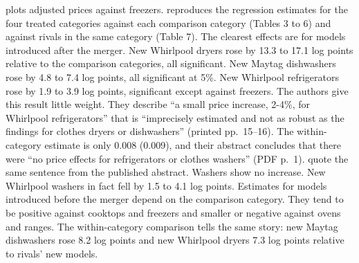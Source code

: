   plots adjusted prices against freezers.  reproduces
the regression estimates for the four treated categories against each comparison category (Tables 3 to 6) and
against rivals in the same category (Table 7). The clearest effects are for models introduced after the merger.
New Whirlpool dryers rose by 13.3 to 17.1 log points relative to the comparison categories, all significant. New
Maytag dishwashers rose by 4.8 to 7.4 log points, all significant at 5\%. New Whirlpool refrigerators rose by 1.9 to
3.9 log points, significant except against freezers. The authors give this result little weight. They describe ``a
small price increase, 2-4\%, for Whirlpool refrigerators'' that is ``imprecisely estimated and not as robust as the
findings for clothes dryers or dishwashers'' (printed pp.~15--16). The within-category estimate is only 0.008
(0.009), and their abstract concludes that there were ``no price effects for refrigerators or clothes washers''
(PDF p.~1). \citet[p.~262]{AskerNocke2021} quote the same sentence from the published abstract. Washers show no
increase. New Whirlpool washers in fact fell
by 1.5 to 4.1 log points. Estimates for models introduced before the merger depend on the comparison category.
They tend to be positive against cooktops and freezers and smaller or negative against ovens and ranges. The
within-category comparison tells the same story: new Maytag dishwashers rose 8.2 log points and new Whirlpool
dryers 7.3 log points relative to rivals' new models.

